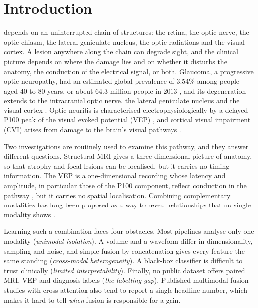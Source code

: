 \section{Introduction}
 depends on an uninterrupted chain of structures: the retina, the optic nerve, the optic chiasm, the lateral geniculate nucleus, the optic radiations and the visual cortex. A lesion anywhere along the chain can degrade sight, and the clinical picture depends on where the damage lies and on whether it disturbs the anatomy, the conduction of the electrical signal, or both. Glaucoma, a progressive optic neuropathy, had an estimated global prevalence of 3.54\% among people aged 40 to 80 years, or about 64.3 million people in 2013 \cite{tham2014}, and its degeneration extends to the intracranial optic nerve, the lateral geniculate nucleus and the visual cortex \cite{gupta2006}. Optic neuritis is characterised electrophysiologically by a delayed P100 peak of the visual evoked potential (VEP) \cite{halliday1972}, and cortical visual impairment (CVI) arises from damage to the brain's visual pathways \cite{sakki2018}.

Two investigations are routinely used to examine this pathway, and they answer different questions. Structural MRI gives a three-dimensional picture of anatomy, so that atrophy and focal lesions can be localised, but it carries no timing information. The VEP is a one-dimensional recording whose latency and amplitude, in particular those of the P100 component, reflect conduction in the pathway \cite{odom2016}, but it carries no spatial localisation. Combining complementary modalities has long been proposed as a way to reveal relationships that no single modality shows \cite{calhoun2016}.

Learning such a combination faces four obstacles. Most pipelines analyse only one modality (\emph{unimodal isolation}). A volume and a waveform differ in dimensionality, sampling and noise, and simple fusion by concatenation gives every feature the same standing (\emph{cross-modal heterogeneity}). A black-box classifier is difficult to trust clinically (\emph{limited interpretability}). Finally, no public dataset offers paired MRI, VEP and diagnosis labels (\emph{the labelling gap}). Published multimodal fusion studies with cross-attention \cite{zhou2024camf,dhar2025drifa} also tend to report a single headline number, which makes it hard to tell \emph{when} fusion is responsible for a gain.

